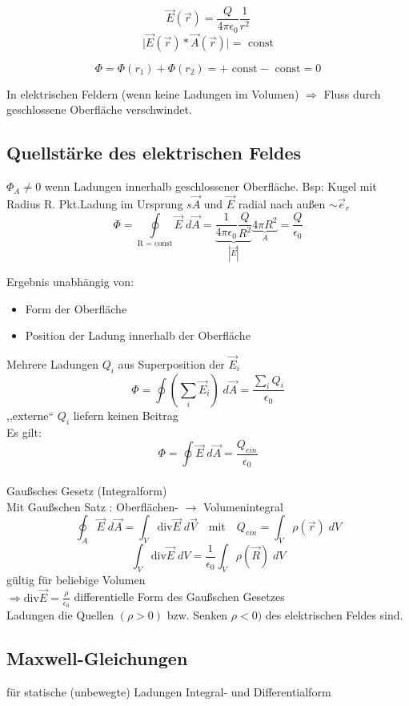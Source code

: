 \documentclass[titlepage,12pt,a4paper,ngerman]{report}
\begin{document}
$$\vec{E}(\vec{r}) = \frac{Q}{4\pi\epsilon_0} \frac{1}{r^2} $$
$$\bigg | \vec{E}(\vec{r}) * \vec{A}(\vec{r}) \bigg | = \textrm{ const}$$

$$\Phi = \Phi(r_1) + \Phi(r_2) = + \textrm{ const} - \textrm{ const} = 0$$

In elektrischen Feldern (wenn keine Ladungen im Volumen) $\Rightarrow $ Fluss durch geschlossene Oberfläche verschwindet.

\subsection{Quellstärke des elektrischen Feldes}
$\Phi_A \neq 0$ wenn Ladungen innerhalb geschlossener Oberfläche. Bsp: Kugel mit Radius R. Pkt.Ladung im Ursprung $s\vec{A}$ und $\vec{E}$ radial nach außen $\sim \vec{e}_r$ 
$$\Phi = \oint\limits_{\textrm{R = const}} \vec{E}\; d \vec{A} = \underbrace{\frac{1}{4\pi\epsilon_0} \frac{Q}{R^2}}_{|\vec{E}|} \underbrace{4\pi R^2}_{A} = \frac{Q}{\epsilon_0}$$

Ergebnis unabhängig von:
\begin{itemize}
\item Form der Oberfläche
\item Position der Ladung innerhalb der Oberfläche
\end{itemize} 
Mehrere Ladungen $Q_i$ aus Superposition der $\vec{E}_i$ 
$$\Phi = \oint (\sum_i \vec{E}_i) \;d \vec{A} = \frac{\sum_i Q_i}{\epsilon_0}$$
,,externe`` $Q_i$ liefern keinen Beitrag\\
Es gilt:\\


$$\Phi = \oint \vec{E}\; d\vec{A} = \frac{Q_{ein}}{\epsilon_0} $$ \\
Gaußsches Gesetz (Integralform)\\
Mit Gaußschen Satz : Oberflächen- $\rightarrow$ Volumenintegral\\
$$ \oint_A \vec{E} \;d \vec{A} = \int_V \textrm{div} \vec{E} \; d \vec{V} \quad \textrm{mit} \quad Q_{ein} = \int_V \rho(\vec{r})\;dV$$
$$\int_V \textrm{div} \vec{E}\; dV = \frac{1}{\epsilon_0} \int_V \rho(\vec{R}) \; dV$$
gültig für beliebige Volumen\\
$\Rightarrow \textrm{div} \vec{E}=\frac{\rho}{\epsilon_0}$ differentielle Form des Gaußschen Gesetzes\\
Ladungen die Quellen $(\rho > 0 )$ bzw. Senken $\rho < 0)$ des elektrischen Feldes sind.

\subsection{Maxwell-Gleichungen}
für statische (unbewegte) Ladungen
Integral- und Differentialform \\
\end{document}
